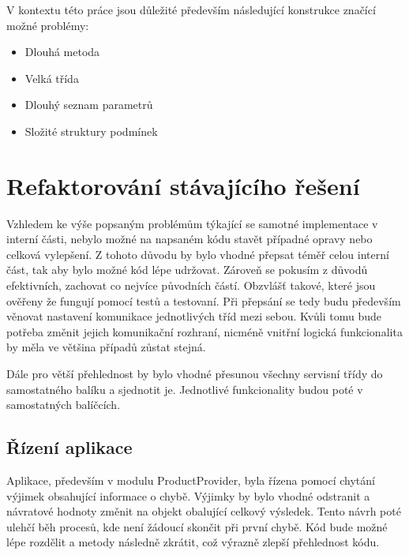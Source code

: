 \documentclass[thesis=B,czech]{FITthesis}[2012/06/26]
\begin{document}
V kontextu této práce jsou důležité především následující konstrukce značící možné problémy: \cite{refaktoring} 
\begin{itemize}
\item Dlouhá metoda
\item Velká třída
\item Dlouhý seznam parametrů
\item Složité struktury podmínek
\end{itemize}

\section{Refaktorování stávajícího řešení}
Vzhledem ke výše popsaným problémům týkající se samotné implementace v interní části, nebylo možné na napsaném kódu stavět
případné opravy nebo celková vylepšení. Z tohoto důvodu by bylo vhodné přepsat téměř celou interní část, tak aby bylo možné
kód lépe udržovat. Zároveň se pokusím z důvodů efektivních, zachovat co nejvíce původních částí. Obzvlášť takové, které jsou ověřeny
že fungují pomocí testů a testovaní. Při přepsání se tedy budu především věnovat nastavení komunikace jednotlivých tříd mezi sebou.
Kvůli tomu bude potřeba změnit jejich komunikační rozhraní, nicméně vnitřní logická funkcionalita by měla ve většina případů zůstat
stejná.
\par
Dále pro větší přehlednost by bylo vhodné přesunou všechny servisní třídy do samostatného balíku a sjednotit je. Jednotlivé funkcionality
budou poté v samostatných balíčcích.


\subsection{Řízení aplikace}
Aplikace, především v modulu ProductProvider, byla řízena pomocí chytání výjimek obsahující informace o chybě. Výjimky by bylo vhodné 
odstranit a návratové hodnoty změnit na objekt obalující celkový výsledek. Tento návrh poté ulehčí běh procesů, kde není žádoucí
skončit při první chybě. Kód bude možné lépe rozdělit a metody následně zkrátit, což výrazně zlepší přehlednost kódu.
\end{document}
